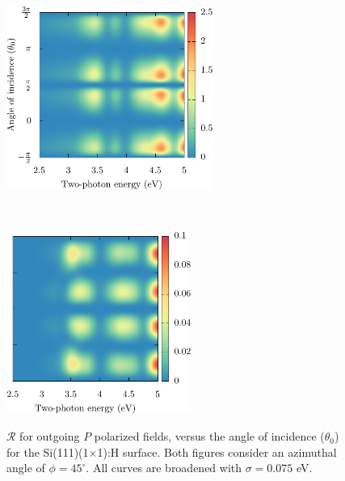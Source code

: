 \documentclass[11pt]{book}
\begin{document}
\begin{figure}
    \begin{minipage}[b]{0.5\textwidth}
        \centering
        \includegraphics[height=6cm]{../figures/04-results/fig-4_4_08}
        \label{fig:1x1rpp3d}
    \end{minipage}
    ~
    \begin{minipage}[b]{0.5\textwidth}
        \centering
        \includegraphics[height=5.945cm]{../figures/04-results/fig-4_4_09}
        \label{fig:1x1rsp3d}
    \end{minipage}
    \caption{$\mathcal{R}$ for outgoing $P$ polarized fields, versus the angle
    of incidence ($\theta_{0}$) for the Si(111)(1$\times$1):H surface. Both
    figures consider an azimuthal angle of $\phi = 45^{\circ}$. All curves are
    broadened with $\sigma = 0.075$ eV.}
    \label{fig:1x1rP3d}
\end{figure}
\end{document}
